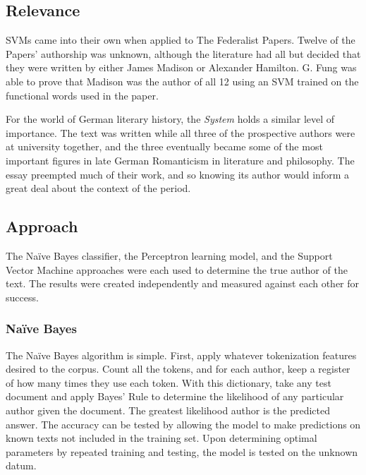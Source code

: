 \documentclass[11pt,letterpaper]{article}
\begin{document}
\subsection{Relevance}

SVMs came into their own when applied to The Federalist Papers. Twelve of the Papers' authorship was unknown, although the literature had all but decided that they were written by either James Madison or Alexander Hamilton. G. Fung was able to prove that Madison was the author of all 12 using an SVM trained on the functional words used in the paper.

For the world of German literary history, the \textit{System} holds a similar level of importance. The text was written while all three of the prospective authors were at university together, and the three eventually became some of the most important figures in late German Romanticism in literature and philosophy. The essay preempted much of their work, and so knowing its author would inform a great deal about the context of the period.

\subsection{Approach}

The Na{\"i}ve Bayes classifier, the Perceptron learning model, and the Support Vector Machine approaches were each used to determine the true author of the text. The results were created independently and measured against each other for success.

\subsubsection{Na{\"i}ve Bayes}
The Na{\"i}ve Bayes algorithm is simple. First, apply whatever tokenization features desired to the corpus. Count all the tokens, and for each author, keep a register of how many times they use each token. With this dictionary, take any test document and apply Bayes' Rule to determine the likelihood of any particular author given the document. The greatest likelihood author is the predicted answer. The accuracy can be tested by allowing the model to make predictions on known texts not included in the training set. Upon determining optimal parameters by repeated training and testing, the model is tested on the unknown datum.
\end{document}
